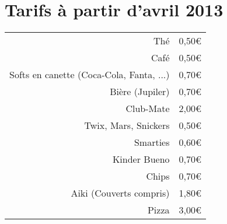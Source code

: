 \documentclass[a4paper,12pt]{article}
\begin{document}
\section*{Tarifs à partir d'avril 2013}
\LARGE
\begin{tabular}{ | r | l |}
  \hline
  Thé & 0,50\euro \\
  Café & 0,50\euro \\
  Softs en canette (Coca-Cola, Fanta, ...) & 0,70\euro \\
  Bière (Jupiler) & 0,70\euro \\
  Club-Mate & 2,00\euro \\
  \hline
  Twix, Mars, Snickers & 0,50\euro \\
  Smarties & 0,60\euro \\
  Kinder Bueno & 0,70\euro \\
  Chips & 0,70\euro \\
  \hline
  Aiki (Couverts compris) & 1,80\euro \\
  Pizza & 3,00\euro \\
  \hline
  
  \hline
\end{tabular}
\end{document}
